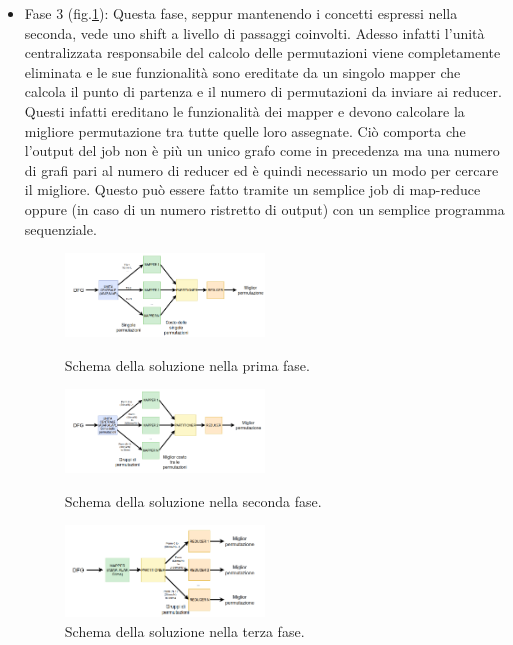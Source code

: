 \documentclass[]{IEEEtran}
\begin{document}
\begin{itemize}
	
	\item Fase 3 (fig.\ref{sol_fase3}): Questa fase, seppur mantenendo i concetti espressi nella seconda, vede uno shift a livello di passaggi coinvolti. Adesso infatti l'unità centralizzata responsabile del calcolo delle permutazioni viene completamente eliminata e le sue funzionalità sono ereditate da un singolo mapper che calcola il punto di partenza e il numero di permutazioni da inviare ai reducer. Questi infatti ereditano le funzionalità dei mapper e devono calcolare la migliore permutazione tra tutte quelle loro assegnate. Ciò comporta che l'output del job non è più un unico grafo come in precedenza ma una numero di grafi pari al numero di reducer ed è quindi necessario un modo per cercare il migliore. Questo può essere fatto tramite un semplice job di map-reduce oppure (in caso di un numero ristretto di output) con un semplice programma sequenziale.
	\begin{figure}[htp]
		\centering
		\includegraphics[width=0.5\textwidth]{images/sol_fase1.png}
		\caption{Schema della soluzione nella prima fase.}
		\label{sol_fase1}
		\includegraphics[width=0.5\textwidth]{images/sol_fase2.png}
		\caption{Schema della soluzione nella seconda fase.}
		\label{sol_fase2}
		\includegraphics[width=0.5\textwidth]{images/sol_schema3.png}
		\caption{Schema della soluzione nella terza fase.}
		\label{sol_fase3}
	\end{figure}

	
\end{itemize}
\end{document}
